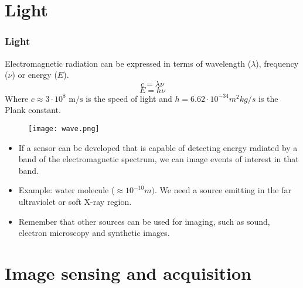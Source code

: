 
\section{Light}


\begin{frame}
\frametitle{Light}
Electromagnetic radiation can be expressed in terms of wavelength ($\lambda$), frequency ($\nu$) or energy ($E$).
\begin{equation}
c=\lambda\nu
\end{equation}
\begin{equation}
E=h\nu
\end{equation}
Where $c\approx 3\cdot 10^{8}\text{ m/s}$ is the speed of light and $h=6.62\cdot 10^{-34}m^{2}kg/s$ is the Plank constant.
\begin{figure}
\texttt{[image: wave.png]}
\end{figure}
\end{frame}


\begin{frame}
\begin{itemize}
\item If a sensor can be developed that is capable of detecting energy radiated by a band of the electromagnetic spectrum, we can image events of interest in that band.
\item Example: water molecule ($\approx 10^{-10}m)$. We need a source emitting in the far ultraviolet or soft X-ray region.
\item Remember that other sources can be used for imaging, such as sound, electron microscopy and synthetic images.
\end{itemize}
\end{frame}


\section{Image sensing and acquisition}


